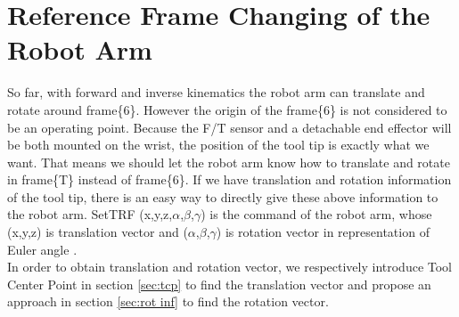 \section{Reference Frame Changing of the Robot Arm}
\label{sec:ref_robot}
So far, with forward and inverse kinematics the robot arm can translate and rotate around frame\{6\}. However the origin of the frame\{6\} is not considered to be an operating point. Because the F/T sensor and a detachable end effector will be both mounted on the wrist, the position of the tool tip is exactly what we want. That means we should let the robot arm know how to translate and rotate in frame\{T\} instead of frame\{6\}. If we have translation and rotation information of the tool tip, there is an easy way to directly give these above information to the robot arm. SetTRF (x,y,z,$\alpha$,$\beta$,$\gamma$) is the command of the robot arm, whose (x,y,z) is translation vector and ($\alpha$,$\beta$,$\gamma$) is rotation vector in representation of Euler angle .\\	
In order to obtain translation and rotation vector, we respectively introduce Tool Center Point in section \ref{sec:tcp} to find the translation vector and propose an approach in section \ref{sec:rot inf} to find the rotation vector.							
